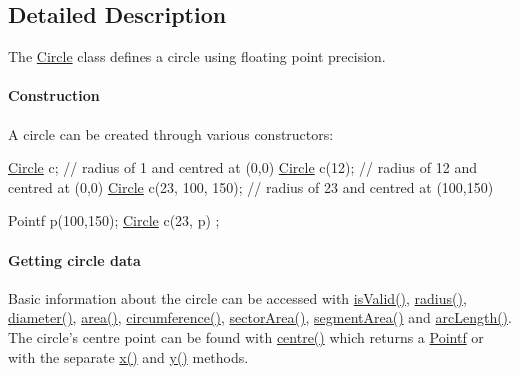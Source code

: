 \subsection{Detailed Description}
The \hyperlink{classprism_1_1_circle}{Circle} class defines a circle using floating point precision.

\paragraph*{Construction}

A circle can be created through various constructors\+:


\begin{DoxyCode}
\hyperlink{classprism_1_1_circle_aff41793f64e90d15a4d89851b1a6b011}{Circle} c; \textcolor{comment}{// radius of 1 and centred at (0,0)}
\hyperlink{classprism_1_1_circle_aff41793f64e90d15a4d89851b1a6b011}{Circle} c(12); \textcolor{comment}{// radius of 12 and centred at (0,0)}
\hyperlink{classprism_1_1_circle_aff41793f64e90d15a4d89851b1a6b011}{Circle} c(23, 100, 150); \textcolor{comment}{// radius of 23 and centred at (100,150)}

Pointf p(100,150);
\hyperlink{classprism_1_1_circle_aff41793f64e90d15a4d89851b1a6b011}{Circle} c(23, p) ;
\end{DoxyCode}


\paragraph*{Getting circle data}

Basic information about the circle can be accessed with \hyperlink{classprism_1_1_circle_adbc46c944f02c028ec95acd1a9b69c5b}{is\+Valid()}, \hyperlink{classprism_1_1_circle_a75afa2c59f92909d6b6edcec338030fb}{radius()}, \hyperlink{classprism_1_1_circle_a9157a21edb3cf02e2eae06d97fe7dec4}{diameter()}, \hyperlink{classprism_1_1_circle_a2fd1893972ad8b267bebfdc59efafb84}{area()}, \hyperlink{classprism_1_1_circle_ad32df9ed83620dd55e9541af31258899}{circumference()}, \hyperlink{classprism_1_1_circle_a0218baa72b2668f116058928c495cf00}{sector\+Area()}, \hyperlink{classprism_1_1_circle_a454311b6f7a7db3f0cea53971abfdbdc}{segment\+Area()} and \hyperlink{classprism_1_1_circle_a8784d12fcb2c2a2ca679635afba4c15e}{arc\+Length()}. The circle’s centre point can be found with \hyperlink{classprism_1_1_circle_acecd853a1b505fc0c847b7172974d669}{centre()} which returns a \hyperlink{classprism_1_1_pointf}{Pointf} or with the separate \hyperlink{classprism_1_1_circle_ae1f729f8fa34605123628e67b230b6be}{x()} and \hyperlink{classprism_1_1_circle_a6edc045d912b0d278bd0673af028290e}{y()} methods.

